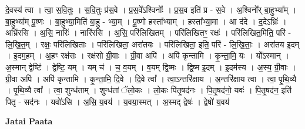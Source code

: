 \documentclass[17pt]{extarticle}
\begin{document}
दे॒वस्य॑ त्वा । त्वा॒ स॒वि॒तुः । स॒वि॒तुः प्र॑स॒वे । प्र॒स॒वे᳚ऽश्विनोः᳚ । प्र॒स॒व इति॑ प्र - स॒वे । अ॒श्विनो᳚र् बा॒हुभ्या᳚म् । बा॒हुभ्या᳚म् पू॒ष्णः । बा॒हुभ्या॒मिति॑ बा॒हु - भ्या॒म् । पू॒ष्णो हस्ता᳚भ्याम् । हस्ता᳚भ्या॒मा । 
आ द॑दे । द॒देऽभ्रिः॑ । अभ्रि॑रसि । अ॒सि॒ नारिः॑ । नारि॑रसि । अ॒सि॒ 
परि॑लिखितम् । परि॑लिखितꣳ॒॒ रक्षः॑ । परि॑लिखित॒मिति॒ परि॑ - लि॒खि॒त॒म् । रक्षः॒ परि॑लिखिताः । परि॑लिखिता॒ अरा॑तयः । परि॑लिखिता॒ इति॒ परि॑ - लि॒खि॒ताः॒ । अरा॑तय इ॒दम् । इ॒दम॒हम् । अ॒हꣳ रक्ष॑सः । 
रक्ष॑सो ग्री॒वाः । ग्री॒वा अपि॑ । अपि॑ कृन्तामि । कृ॒न्ता॒मि॒ यः । यो᳚ऽस्मान् । अ॒स्मान् द्वेष्टि॑ । द्वेष्टि॒ यम् । यम् च॑ । च॒ व॒यम् । व॒यम् द्वि॒ष्मः । द्वि॒ष्म इ॒दम् । इ॒दम॑स्य । अ॒स्य॒ ग्री॒वाः । ग्री॒वा अपि॑ । अपि॑ कृन्तामि । कृ॒न्ता॒मि॒ दि॒वे । दि॒वे त्वा᳚ । त्वा॒ऽन्तरि॑क्षाय । अ॒न्तरि॑क्षाय त्वा । त्वा॒ पृ॒थि॒व्यै । पृ॒थि॒व्यै त्वा᳚ । त्वा॒ शुन्ध॑ताम् । शुन्ध॑तां ॅलो॒कः । लो॒कः पि॑तृ॒षद॑नः । पि॒तृ॒षद॑नो॒ यवः॑ । पि॒तृ॒षद॑न॒ इति॑ पितृ - सद॑नः । यवो॑ऽसि । अ॒सि॒ य॒वय॑ । य॒वया॒स्मत् । अ॒स्मद् द्वेषः॑ । द्वेषो॑ य॒वय॑ \newline

\textbf{Jatai Paata} \newline
\end{document}
